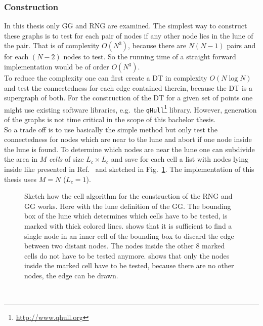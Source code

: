     \subsubsection{Construction}
        In this thesis only GG and RNG are examined.
        The simplest way to construct these graphs is to test for each
        pair of nodes if any other node lies in
        the lune of the pair. That is of complexity \(O (N^3)\), because
        there are \(N(N-1)\) pairs and for each \((N-2)\) nodes to test. So
        the running time of a straight forward implementation would be of
        order \(O(N^3)\).\\
        To reduce the complexity one can first create a DT in complexity \(O (N \log N)\)
        \cite{RNGCell} and test the connectedness for each edge contained
        therein, because the DT is a supergraph of both.
        For the construction of the DT for a given set of points one might
        use existing software libraries, e.g.\ the \texttt{qHull}\footnote{\url{http://www.qhull.org}} library.
        However, generation of the graphs is not time critical in the scope
        of this bachelor thesis.\\
        So a trade off is to use basically the simple method but only test
        the connectedness for nodes which are near to the lune and abort if
        one node inside the lune is found. To determine which nodes are
        near the lune one can subdivide the area in \(M\) \emph{cells} of size
        \(L_c \times L_c\) and save for each cell a list with nodes lying
        inside like presented in Ref.\ \cite{RNGCell} and sketched in Fig.\ \ref{fig:cell}.
        The implementation of this thesis uses \(M = N\) (\(L_c = 1\)).
        \begin{figure}[htbp]
            \centering
            \caption[Sketch how the Cell Method works]
            {
                Sketch how the cell algorithm for the construction of the
                RNG and GG works. Here with the lune definition of the GG.
                The bounding box of the lune which determines which cells have
                to be tested, is marked with thick colored lines.
                 shows that it is sufficient to find a
                single node in an inner cell of the bounding box to discard
                the edge between two distant nodes. The nodes inside the
                other 8 marked cells do not have to be tested anymore.
                 shows that only the nodes inside the
                marked cell have to be tested, because there are no other nodes,
                the edge can be drawn.
            }
            \label{fig:cell}
        \end{figure}\\
